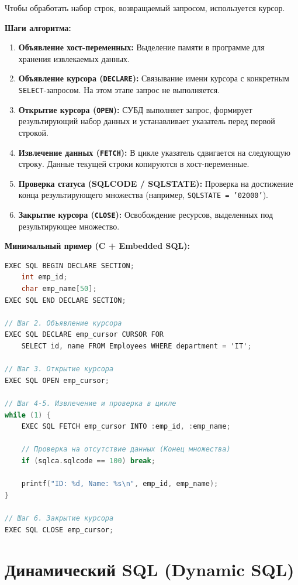 \documentclass[12pt, a4paper]{article}
\begin{document}
Чтобы обработать набор строк, возвращаемый запросом, используется курсор.

\textbf{Шаги алгоритма:}
\begin{enumerate}
    \item \textbf{Объявление хост-переменных:} Выделение памяти в программе для хранения извлекаемых данных.
    \item \textbf{Объявление курсора (\texttt{DECLARE}):} Связывание имени курсора с конкретным \texttt{SELECT}-запросом. На этом этапе запрос не выполняется.
    \item \textbf{Открытие курсора (\texttt{OPEN}):} СУБД выполняет запрос, формирует результирующий набор данных и устанавливает указатель перед первой строкой.
    \item \textbf{Извлечение данных (\texttt{FETCH}):} В цикле указатель сдвигается на следующую строку. Данные текущей строки копируются в хост-переменные.
    \item \textbf{Проверка статуса (SQLCODE / SQLSTATE):} Проверка на достижение конца результирующего множества (например, \texttt{SQLSTATE = '02000'}).
    \item \textbf{Закрытие курсора (\texttt{CLOSE}):} Освобождение ресурсов, выделенных под результирующее множество.
\end{enumerate}

\textbf{Минимальный пример (C + Embedded SQL):}
\begin{lstlisting}[language=C]
EXEC SQL BEGIN DECLARE SECTION;
    int emp_id;
    char emp_name[50];
EXEC SQL END DECLARE SECTION;

// Шаг 2. Объявление курсора
EXEC SQL DECLARE emp_cursor CURSOR FOR
    SELECT id, name FROM Employees WHERE department = 'IT';

// Шаг 3. Открытие курсора
EXEC SQL OPEN emp_cursor;

// Шаг 4-5. Извлечение и проверка в цикле
while (1) {
    EXEC SQL FETCH emp_cursor INTO :emp_id, :emp_name;

    // Проверка на отсутствие данных (Конец множества)
    if (sqlca.sqlcode == 100) break;

    printf("ID: %d, Name: %s\n", emp_id, emp_name);
}

// Шаг 6. Закрытие курсора
EXEC SQL CLOSE emp_cursor;
\end{lstlisting}

\section{Динамический SQL (Dynamic SQL)}
\end{document}
